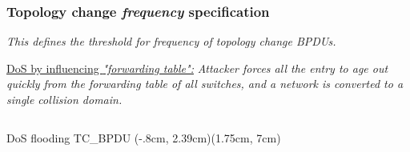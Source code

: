\documentclass[10pt, blue,subsection=true, compress]{beamer}
\begin{document}
\begin{frame} \frametitle{Topology change \textit{frequency} specification}
\emph{This defines the threshold for frequency of topology change BPDUs.} 

\vspace{2 mm}


\underline{DoS by influencing\textit{ "forwarding table":}}
\emph{Attacker forces all the entry to age out quickly from the forwarding table of all switches, and a network is converted to a single collision domain. }

\begin{columns}[t]
\pause

\begin{block}{DoS flooding TC\_BPDU}
(-.8cm, 2.39cm)(1.75cm, 7cm)


\end{block}
\end{columns}
\end{frame}
\end{document}
